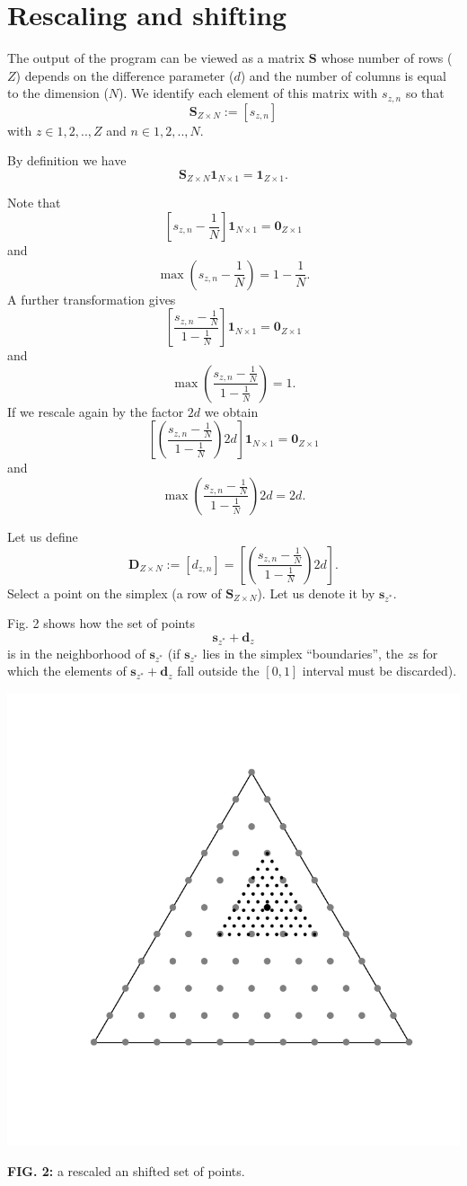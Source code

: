 \documentclass[12pt,a4paper]{article}
\begin{document}
\section*{Rescaling and shifting}
The output of the program can be viewed as a matrix $\textbf{S}$ whose number of rows ($Z$) depends on the difference parameter ($d$) and the number of columns is equal to the dimension ($N$). 
We identify each element of this matrix with $s_{z,n}$ so that 
\[
\textbf{S}_{Z\times N}:=[s_{z,n}]
\]
with $z \in {1,2,..,Z}$ and $n \in {1,2,..,N}$.

By definition we have
\[
\textbf{S}_{Z\times N}\textbf{1}_{N\times 1}=\textbf{1}_{Z\times 1}.
\]

Note that
\[
\left[s_{z,n}-\frac{1}{N}\right]\textbf{1}_{N\times 1}=\textbf{0}_{Z\times 1}
\]
and
\[
\max \left(s_{z,n}-\frac{1}{N}\right)=1-\frac{1}{N}.
\]
A further transformation gives 
\[
\left[\frac{s_{z,n}-\frac{1}{N}}{1-\frac{1}{N}}\right]\textbf{1}_{N\times 1}=\textbf{0}_{Z\times 1}
\]
and
\[
\max \left(\frac{s_{z,n}-\frac{1}{N}}{1-\frac{1}{N}}\right)=1.
\]
If we rescale again by the factor $2d$ we obtain
\[
\left[\left(\frac{s_{z,n}-\frac{1}{N}}{1-\frac{1}{N}}\right)2d\right]\textbf{1}_{N\times 1}=\textbf{0}_{Z\times 1}
\]
and
\[
\max \left(\frac{s_{z,n}-\frac{1}{N}}{1-\frac{1}{N}}\right)2d=2d.
\]


Let us define
\[
\textbf{D}_{Z\times N}:=[d_{z,n}]=\left[\left(\frac{s_{z,n}-\frac{1}{N}}{1-\frac{1}{N}}\right)2d\right].
\]
Select a point on the simplex (a row of $\textbf{S}_{Z\times N}$). Let us denote it by $\textbf{s}_{z^*}$.

Fig. 2 shows how the set of points 
\[
\textbf{s}_{z^*}+\textbf{d}_{z}
\]
is in the neighborhood of $\textbf{s}_{z^*}$ (if $\textbf{s}_{z^*}$ lies in the simplex ``boundaries'', the $z$s for which the elements of $\textbf{s}_{z^*}+\textbf{d}_{z}$ fall outside the $[0,1]$ interval must be discarded). 

\centerline{\includegraphics[scale=0.5]{fig2.pdf}}
\vspace{-1cm}
\textbf{FIG. 2:} a rescaled an shifted set of points.

\newpage
\end{document}
